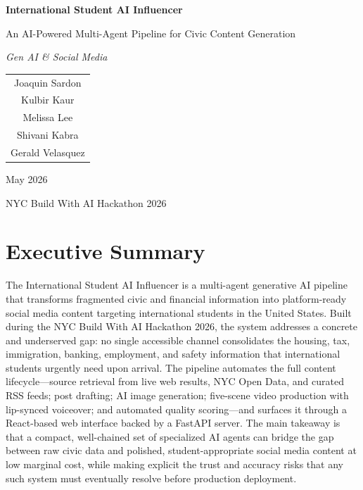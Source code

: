 \documentclass[12pt, letterpaper]{article}
\begin{document}
\begin{titlepage}
  \centering
  \vspace*{2cm}
  {\LARGE\bfseries International Student AI Influencer\par}
  \vspace{0.5cm}
  {\large An AI-Powered Multi-Agent Pipeline for Civic Content Generation\par}
  \vspace{2cm}
  {\large\itshape Gen AI \& Social Media\par}
  \vspace{1.5cm}

  \begin{tabular}{c}
    \large Joaquin Sardon \\[4pt]
    \large Kulbir Kaur \\[4pt]
    \large Melissa Lee \\[4pt]
    \large Shivani Kabra \\[4pt]
    \large Gerald Velasquez \\
  \end{tabular}

  \vspace{2cm}
  {\large May 2026\par}
  \vfill
  {\small NYC Build With AI Hackathon 2026}
\end{titlepage}

\newpage
\thispagestyle{empty}
\mbox{}
\newpage

\section*{Executive Summary}

The International Student AI Influencer is a multi-agent generative AI pipeline that
transforms fragmented civic and financial information into platform-ready social media
content targeting international students in the United States. Built during the NYC
Build With AI Hackathon 2026, the system addresses a concrete and underserved gap: no
single accessible channel consolidates the housing, tax, immigration, banking, employment,
and safety information that international students urgently need upon arrival. The
pipeline automates the full content lifecycle---source retrieval from live web results,
NYC Open Data, and curated RSS feeds; post drafting; AI image generation; five-scene
video production with lip-synced voiceover; and automated quality scoring---and surfaces
it through a React-based web interface backed by a FastAPI server. The main takeaway
is that a compact, well-chained set of specialized AI agents can bridge the gap between
raw civic data and polished, student-appropriate social media content at low marginal
cost, while making explicit the trust and accuracy risks that any such system must
eventually resolve before production deployment.
\end{document}
